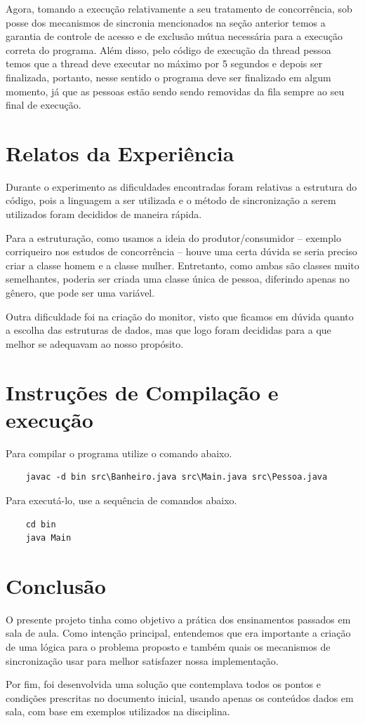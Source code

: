 \documentclass[review]{elsarticle}
\begin{document}
Agora, tomando a execução relativamente a seu tratamento de concorrência, sob posse dos mecanismos de sincronia mencionados na seção anterior temos a garantia de controle de acesso e de exclusão mútua necessária para a execução correta do programa. Além disso, pelo código de execução da thread pessoa temos que a thread deve executar no máximo por 5 segundos e depois ser finalizada, portanto, nesse sentido o programa deve ser finalizado em algum momento, já que as pessoas estão sendo sendo removidas da fila sempre ao seu final de execução.

\section{Relatos da Experiência}

Durante o experimento as dificuldades encontradas foram relativas a estrutura do código, pois a linguagem a ser utilizada e o método de sincronização a serem utilizados foram decididos de maneira rápida.

Para a estruturação, como usamos a ideia do produtor/consumidor – exemplo corriqueiro nos estudos de concorrência – houve uma certa dúvida se seria preciso criar a classe homem e a classe mulher. Entretanto, como ambas são classes muito semelhantes, poderia ser criada uma classe única de pessoa, diferindo apenas no gênero, que pode ser uma variável.

Outra dificuldade foi na criação do monitor, visto que ficamos em dúvida quanto a escolha das estruturas de dados, mas que logo foram decididas para a  que melhor se adequavam ao nosso propósito.

\section{Instruções de Compilação e execução}

Para compilar o programa utilize o comando abaixo.

\begin{verbatim}
    javac -d bin src\Banheiro.java src\Main.java src\Pessoa.java 
\end{verbatim}

Para executá-lo, use a sequência de comandos abaixo.

\begin{verbatim}
    cd bin
    java Main
\end{verbatim}

\section{Conclusão}

O presente projeto tinha como objetivo a prática  dos ensinamentos passados em sala de aula. Como intenção principal, entendemos que era importante a criação de uma lógica para o problema proposto e também quais os mecanismos de sincronização usar para melhor satisfazer nossa implementação. 

Por fim, foi desenvolvida uma solução que contemplava todos os pontos e condições prescritas no documento inicial, usando apenas os conteúdos dados em sala, com base em exemplos utilizados na disciplina.
\end{document}
